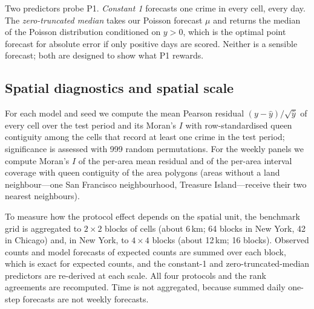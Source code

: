 \documentclass[preprint,12pt,authoryear]{elsarticle}
\begin{document}
Two predictors probe P1. \emph{Constant 1} forecasts one crime in every cell, every day. The \emph{zero-truncated median} takes our Poisson forecast $\mu$ and returns the median of the Poisson distribution conditioned on $y>0$, which is the optimal point forecast for absolute error if only positive days are scored. Neither is a sensible forecast; both are designed to show what P1 rewards.

\subsection{Spatial diagnostics and spatial scale}\label{sec:spatial-methods}
For each model and seed we compute the mean Pearson residual $(y-\hat y)/\sqrt{\hat y}$ of every cell over the test period and its Moran's $I$ \citep{moran1950notes} with row-standardised queen contiguity among the cells that record at least one crime in the test period; significance is assessed with 999 random permutations. For the weekly panels we compute Moran's $I$ of the per-area mean residual and of the per-area interval coverage with queen contiguity of the area polygons (areas without a land neighbour---one San Francisco neighbourhood, Treasure Island---receive their two nearest neighbours).

To measure how the protocol effect depends on the spatial unit, the benchmark grid is aggregated to $2\times2$ blocks of cells (about 6\,km; 64 blocks in New York, 42 in Chicago) and, in New York, to $4\times4$ blocks (about 12\,km; 16 blocks). Observed counts and model forecasts of expected counts are summed over each block, which is exact for expected counts, and the constant-1 and zero-truncated-median predictors are re-derived at each scale. All four protocols and the rank agreements are recomputed. Time is not aggregated, because summed daily one-step forecasts are not weekly forecasts.
\end{document}
